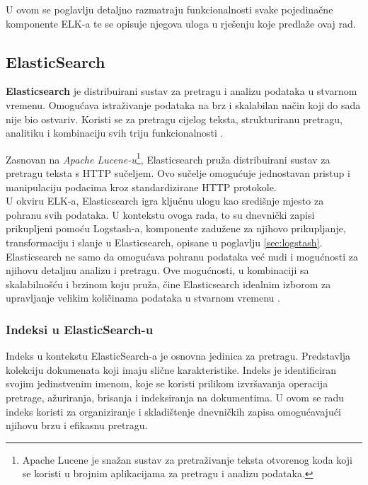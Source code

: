 \documentclass[times, utf8, diplomski]{fer}
\begin{document}
U ovom se poglavlju detaljno razmatraju funkcionalnosti svake pojedinačne komponente ELK-a te se opisuje njegova uloga u rješenju koje predlaže ovaj rad.

\subsection{ElasticSearch}
\label{sec:elastic}

\textbf{Elasticsearch} je distribuirani sustav za pretragu i analizu podataka u stvarnom vremenu. Omogućava istraživanje podataka na brz i skalabilan način koji do sada nije bio ostvariv. Koristi se za pretragu cijelog teksta, strukturiranu pretragu, analitiku i kombinaciju svih triju funkcionalnosti \citep{gormley_elasticsearch_2015}.

Zasnovan na \emph{Apache Lucene-u}\footnote{Apache Lucene je snažan sustav za pretraživanje teksta otvorenog koda koji se koristi u brojnim aplikacijama za pretragu i analizu podataka.}, Elasticsearch pruža distribuirani sustav za pretragu teksta s HTTP sučeljem. Ovo sučelje omogućuje jednostavan pristup i manipulaciju podacima kroz standardizirane HTTP protokole. \\

U okviru ELK-a, Elasticsearch igra ključnu ulogu kao središnje mjesto za pohranu svih podataka. U kontekstu ovoga rada, to su dnevnički zapisi prikupljeni pomoću Logstash-a, komponente zadužene za njihovo prikupljanje, transformaciju i slanje u Elasticsearch, opisane u poglavlju \ref{sec:logstash}.\\

Elasticsearch ne samo da omogućava pohranu podataka već nudi i mogućnosti za njihovu detaljnu analizu i pretragu. Ove mogućnosti, u kombinaciji sa skalabilnošću i brzinom koju pruža, čine Elasticsearch idealnim izborom za upravljanje velikim količinama podataka u stvarnom vremenu .

\subsubsection{Indeksi u ElasticSearch-u}

Indeks u kontekstu ElasticSearch-a je osnovna jedinica za pretragu. Predstavlja kolekciju dokumenata koji imaju slične karakteristike. Indeks je identificiran svojim jedinstvenim imenom, koje se koristi prilikom izvršavanja operacija pretrage, ažuriranja, brisanja i indeksiranja na dokumentima. U ovom se radu indeks koristi za organiziranje i skladištenje dnevničkih zapisa omogućavajući njihovu brzu i efikasnu pretragu.
\end{document}
